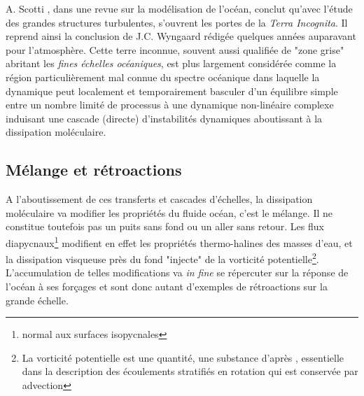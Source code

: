 A. Scotti \citep{scotti_large_2010}, dans une revue sur la modélisation de l'océan, conclut qu’avec l'étude des grandes structures turbulentes, s'ouvrent les portes de la \textit{Terra Incognita}. Il reprend ainsi la conclusion de J.C. Wyngaard \citep{wyngaard_toward_2004} rédigée quelques années auparavant pour l'atmosphère. Cette terre inconnue, souvent aussi qualifiée de "zone grise" abritant les \textit{fines échelles océaniques}, est plus largement considérée comme la région particulièrement mal connue du spectre océanique dans laquelle la dynamique peut localement et temporairement basculer d'un équilibre simple entre un nombre limité de processus à une dynamique non-linéaire complexe induisant une cascade (directe) d'instabilités dynamiques aboutissant à la dissipation moléculaire. 
\color{black}
\subsection{Mélange et rétroactions}
\label{subsection_retroactions}

A l'aboutissement de ces transferts et cascades d'échelles, la dissipation moléculaire va modifier les propriétés du fluide océan, c'est le mélange.
Il ne constitue toutefois pas un puits sans fond ou un aller sans retour. Les flux diapycnaux\footnote{normal aux surfaces isopycnales} modifient en effet les propriétés thermo-halines des masses d'eau, et la dissipation visqueuse près du fond "injecte" de la vorticité potentielle\footnote{La vorticité potentielle est une quantité, une substance d'après \cite{haynes_conservation_1990}, essentielle dans la description des écoulements stratifiés en rotation qui est conservée par advection}. L'accumulation de telles modifications va \textit{in fine} se répercuter sur la réponse de l'océan à ses forçages et sont donc autant d'exemples de rétroactions sur la grande échelle.



